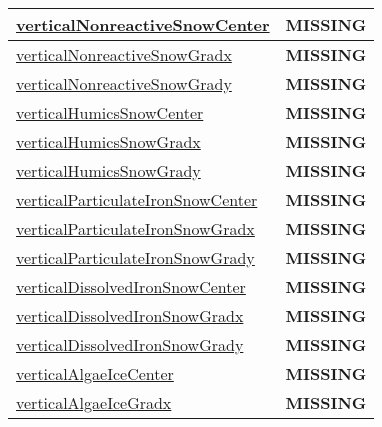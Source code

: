 {\begin{center}
\begin{longtable}{| p{2.0in} | p{4.0in} |}
    \hline
    \hyperref[subsec:var_sec_tracer_reconstruction_verticalNonreactiveSnowCenter]{verticalNonreactiveSnowCenter} & {\bf \color{red} MISSING} \\
    \hline
    \hyperref[subsec:var_sec_tracer_reconstruction_verticalNonreactiveSnowGradx]{verticalNonreactiveSnowGradx} & {\bf \color{red} MISSING} \\
    \hline
    \hyperref[subsec:var_sec_tracer_reconstruction_verticalNonreactiveSnowGrady]{verticalNonreactiveSnowGrady} & {\bf \color{red} MISSING} \\
    \hline
    \hyperref[subsec:var_sec_tracer_reconstruction_verticalHumicsSnowCenter]{verticalHumicsSnowCenter} & {\bf \color{red} MISSING} \\
    \hline
    \hyperref[subsec:var_sec_tracer_reconstruction_verticalHumicsSnowGradx]{verticalHumicsSnowGradx} & {\bf \color{red} MISSING} \\
    \hline
    \hyperref[subsec:var_sec_tracer_reconstruction_verticalHumicsSnowGrady]{verticalHumicsSnowGrady} & {\bf \color{red} MISSING} \\
    \hline
    \hyperref[subsec:var_sec_tracer_reconstruction_verticalParticulateIronSnowCenter]{verticalParticulateIronSnow\-Center} & {\bf \color{red} MISSING} \\
    \hline
    \hyperref[subsec:var_sec_tracer_reconstruction_verticalParticulateIronSnowGradx]{verticalParticulateIronSnow\-Gradx} & {\bf \color{red} MISSING} \\
    \hline
    \hyperref[subsec:var_sec_tracer_reconstruction_verticalParticulateIronSnowGrady]{verticalParticulateIronSnow\-Grady} & {\bf \color{red} MISSING} \\
    \hline
    \hyperref[subsec:var_sec_tracer_reconstruction_verticalDissolvedIronSnowCenter]{verticalDissolvedIronSnowCenter} & {\bf \color{red} MISSING} \\
    \hline
    \hyperref[subsec:var_sec_tracer_reconstruction_verticalDissolvedIronSnowGradx]{verticalDissolvedIronSnowGradx} & {\bf \color{red} MISSING} \\
    \hline
    \hyperref[subsec:var_sec_tracer_reconstruction_verticalDissolvedIronSnowGrady]{verticalDissolvedIronSnowGrady} & {\bf \color{red} MISSING} \\
    \hline
    \hyperref[subsec:var_sec_tracer_reconstruction_verticalAlgaeIceCenter]{verticalAlgaeIceCenter} & {\bf \color{red} MISSING} \\
    \hline
    \hyperref[subsec:var_sec_tracer_reconstruction_verticalAlgaeIceGradx]{verticalAlgaeIceGradx} & {\bf \color{red} MISSING} \\

\end{longtable}
\end{center}}
